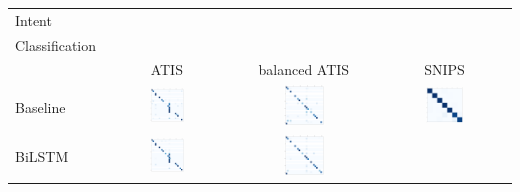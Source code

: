 \documentclass[a4paper]{article}
\begin{document}
\begin{table}[h!]
	\centering
	\begin{adjustbox}{max width=\textwidth}
		\begin{tabular}{l|ccc}
			Intent & & & \\
			Classification & & & \\
			& ATIS & balanced ATIS & SNIPS \\
			\cmidrule{1-4}
			Baseline &  \includegraphics[width=0.3\textwidth]{"../assets/images/confusion matrixes/CM_baseline_intent_ATIS_labeless"} & \includegraphics[width=0.3\textwidth]{"../assets/images/confusion matrixes/CM_baseline_intent_remix_ATIS_labeless"} &\includegraphics[width=0.3\textwidth]{"../assets/images/confusion matrixes/CM_baseline_intent_SNIPS_labeless"} \\
			\cmidrule{1-4}
			BiLSTM &  \includegraphics[width=0.3\textwidth]{"../assets/images/confusion matrixes/CM_BiLSTM_intent_ATIS_labeless.png"} & \includegraphics[width=0.3\textwidth]{"../assets/images/confusion matrixes/CM_BiLSTM_intent_remix_ATIS_labeless"}

\end{tabular}
\end{adjustbox}
\end{table}
\end{document}
